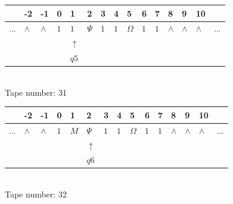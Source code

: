 \documentclass[11pt]{article}
\begin{document}
\begin{table}[H]
\centering
\begin{tabular}{lllllllllllllll}
 & -2 & -1 & 0 & 1 & 2 & 3 & 4 & 5 & 6 & 7 & 8 & 9 & 10 & \\
\hline
$...$ & \multicolumn{1}{|l|}{$\wedge$} & \multicolumn{1}{|l|}{$\wedge$} & \multicolumn{1}{|l|}{$1$} & \multicolumn{1}{|l|}{$1$} & \multicolumn{1}{|l|}{$\Psi$} & \multicolumn{1}{|l|}{$1$} & \multicolumn{1}{|l|}{$1$} & \multicolumn{1}{|l|}{$\Omega$} & \multicolumn{1}{|l|}{$1$} & \multicolumn{1}{|l|}{$1$} & \multicolumn{1}{|l|}{$\wedge$} & \multicolumn{1}{|l|}{$\wedge$} & \multicolumn{1}{|l|}{$\wedge$} & $...$\\
\hline
&  &  &  & $\uparrow$ &  &  &  &  &  &  &  &  &  &  \\
&  &  &  & $ q5 $ &  &  &  &  &  &  &  &  &  &  \\
\end{tabular}
\\
Tape number: 31
\noindent\makebox[\linewidth]{\hdashrule{\textwidth}{1pt}{1pt}}\end{table}

\begin{table}[H]
\centering
\begin{tabular}{lllllllllllllll}
 & -2 & -1 & 0 & 1 & 2 & 3 & 4 & 5 & 6 & 7 & 8 & 9 & 10 & \\
\hline
$...$ & \multicolumn{1}{|l|}{$\wedge$} & \multicolumn{1}{|l|}{$\wedge$} & \multicolumn{1}{|l|}{$1$} & \multicolumn{1}{|l|}{$M$} & \multicolumn{1}{|l|}{$\Psi$} & \multicolumn{1}{|l|}{$1$} & \multicolumn{1}{|l|}{$1$} & \multicolumn{1}{|l|}{$\Omega$} & \multicolumn{1}{|l|}{$1$} & \multicolumn{1}{|l|}{$1$} & \multicolumn{1}{|l|}{$\wedge$} & \multicolumn{1}{|l|}{$\wedge$} & \multicolumn{1}{|l|}{$\wedge$} & $...$\\
\hline
&  &  &  &  & $\uparrow$ &  &  &  &  &  &  &  &  &  \\
&  &  &  &  & $ q6 $ &  &  &  &  &  &  &  &  &  \\
\end{tabular}
\\
Tape number: 32
\noindent\makebox[\linewidth]{\hdashrule{\textwidth}{1pt}{1pt}}\end{table}
\end{document}

